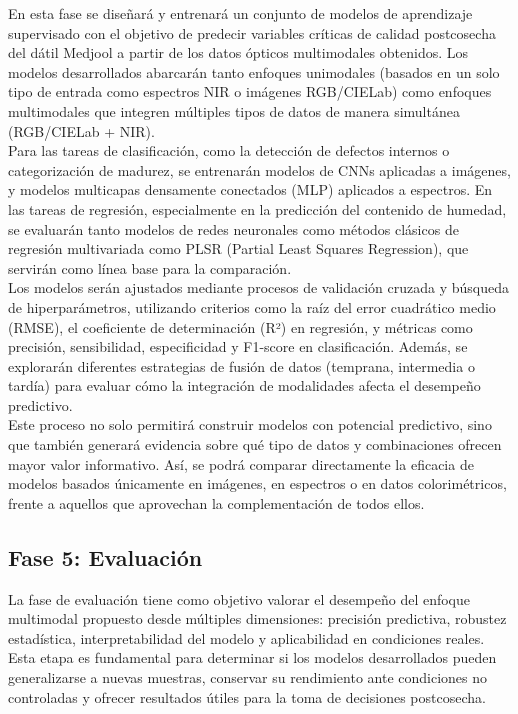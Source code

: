 En esta fase se diseñará y entrenará un conjunto de modelos de aprendizaje supervisado con el objetivo de predecir variables críticas de calidad postcosecha del dátil Medjool a partir de los datos ópticos multimodales obtenidos. Los modelos desarrollados abarcarán tanto enfoques unimodales (basados en un solo tipo de entrada como espectros NIR o imágenes RGB/CIELab) como enfoques multimodales que integren múltiples tipos de datos de manera simultánea (RGB/CIELab + NIR).\\

Para las tareas de clasificación, como la detección de defectos internos o categorización de madurez, se entrenarán modelos de CNNs aplicadas a imágenes, y modelos multicapas densamente conectados (MLP) aplicados a espectros. En las tareas de regresión, especialmente en la predicción del contenido de humedad, se evaluarán tanto modelos de redes neuronales como métodos clásicos de regresión multivariada como PLSR (Partial Least Squares Regression), que servirán como línea base para la comparación.\\

Los modelos serán ajustados mediante procesos de validación cruzada y búsqueda de hiperparámetros, utilizando criterios como la raíz del error cuadrático medio (RMSE), el coeficiente de determinación (R²) en regresión, y métricas como precisión, sensibilidad, especificidad y F1-score en clasificación. Además, se explorarán diferentes estrategias de fusión de datos (temprana, intermedia o tardía) para evaluar cómo la integración de modalidades afecta el desempeño predictivo.\\

Este proceso no solo permitirá construir modelos con potencial predictivo, sino que también generará evidencia sobre qué tipo de datos y combinaciones ofrecen mayor valor informativo. Así, se podrá comparar directamente la eficacia de modelos basados únicamente en imágenes, en espectros o en datos colorimétricos, frente a aquellos que aprovechan la complementación de todos ellos.

\subsection{Fase 5: Evaluación}

La fase de evaluación tiene como objetivo valorar el desempeño del enfoque multimodal propuesto desde múltiples dimensiones: precisión predictiva, robustez estadística, interpretabilidad del modelo y aplicabilidad en condiciones reales. Esta etapa es fundamental para determinar si los modelos desarrollados pueden generalizarse a nuevas muestras, conservar su rendimiento ante condiciones no controladas y ofrecer resultados útiles para la toma de decisiones postcosecha.\\

